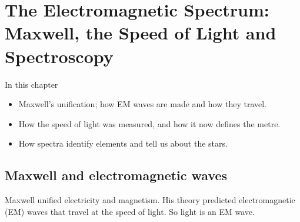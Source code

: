 \chapter[The Electromagnetic Spectrum]{The Electromagnetic Spectrum: Maxwell, the Speed of Light and Spectroscopy}\label{ch1:chap}

\begin{summarybox}{In this chapter}
\begin{itemize}
  \item Maxwell's unification; how EM waves are made and how they travel.
  \item How the speed of light was measured, and how it now defines the metre.
  \item How spectra identify elements and tell us about the stars.
\end{itemize}
\end{summarybox}

\section{Maxwell and electromagnetic waves}\label{ch1:sec:maxwell}

\begin{bigidea}
Maxwell unified electricity and magnetism. His theory predicted electromagnetic (EM) waves
that travel at the speed of light. So light is an EM wave.
\end{bigidea}

\begin{keywords}
\end{keywords}

